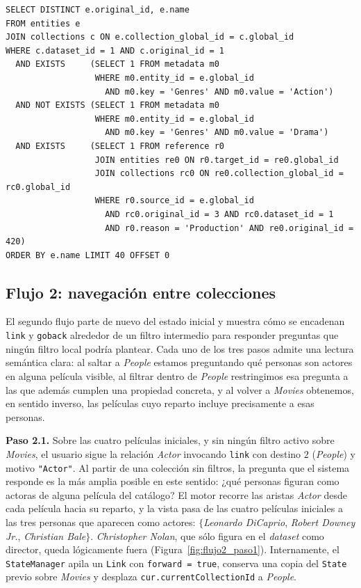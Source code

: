 \begin{lstlisting}[style=sqlStyle, label=lst:flujo1, caption={[SQL del Flujo~1]SQL acumulada al final del Flujo~1.}]
SELECT DISTINCT e.original_id, e.name
FROM entities e
JOIN collections c ON e.collection_global_id = c.global_id
WHERE c.dataset_id = 1 AND c.original_id = 1
  AND EXISTS     (SELECT 1 FROM metadata m0
                  WHERE m0.entity_id = e.global_id
                    AND m0.key = 'Genres' AND m0.value = 'Action')
  AND NOT EXISTS (SELECT 1 FROM metadata m0
                  WHERE m0.entity_id = e.global_id
                    AND m0.key = 'Genres' AND m0.value = 'Drama')
  AND EXISTS     (SELECT 1 FROM reference r0
                  JOIN entities re0 ON r0.target_id = re0.global_id
                  JOIN collections rc0 ON re0.collection_global_id = rc0.global_id
                  WHERE r0.source_id = e.global_id
                    AND rc0.original_id = 3 AND rc0.dataset_id = 1
                    AND r0.reason = 'Production' AND re0.original_id = 420)
ORDER BY e.name LIMIT 40 OFFSET 0
\end{lstlisting}

\FloatBarrier

\subsection{Flujo 2: navegación entre colecciones}
\label{subsec:flujo_navegacion}

El segundo flujo parte de nuevo del estado inicial y muestra cómo se
encadenan \texttt{link} y \texttt{goback} alrededor de un filtro
intermedio para responder preguntas que ningún filtro local podría
plantear. Cada uno de los tres pasos admite una lectura semántica
clara: al saltar a \textit{People} estamos preguntando qué personas
son actores en alguna película visible, al filtrar dentro de
\textit{People} restringimos esa pregunta a las que además cumplen
una propiedad concreta, y al volver a \textit{Movies} obtenemos, en
sentido inverso, las películas cuyo reparto incluye precisamente a
esas personas.

\textbf{Paso 2.1.} Sobre las cuatro películas iniciales, y sin ningún
filtro activo sobre \textit{Movies}, el usuario sigue la relación
\textit{Actor} invocando \texttt{link} con destino $2$
(\textit{People}) y motivo \texttt{"Actor"}. Al partir de una
colección sin filtros, la pregunta que el sistema responde es la más
amplia posible en este sentido: ¿qué personas figuran como actoras de
alguna película del catálogo? El motor recorre las aristas
\textit{Actor} desde cada película hacia su reparto, y la vista pasa
de las cuatro películas iniciales a las tres personas que aparecen
como actores: $\{$\textit{Leonardo DiCaprio}, \textit{Robert Downey
Jr.}, \textit{Christian Bale}$\}$. \textit{Christopher Nolan}, que
sólo figura en el \textit{dataset} como director, queda lógicamente fuera
(Figura~\ref{fig:flujo2_paso1}). Internamente, el
\texttt{StateManager} apila un \texttt{Link} con \texttt{forward =
true}, conserva una copia del \texttt{State} previo sobre
\textit{Movies} y desplaza \texttt{cur.currentCollectionId} a
\textit{People}.

